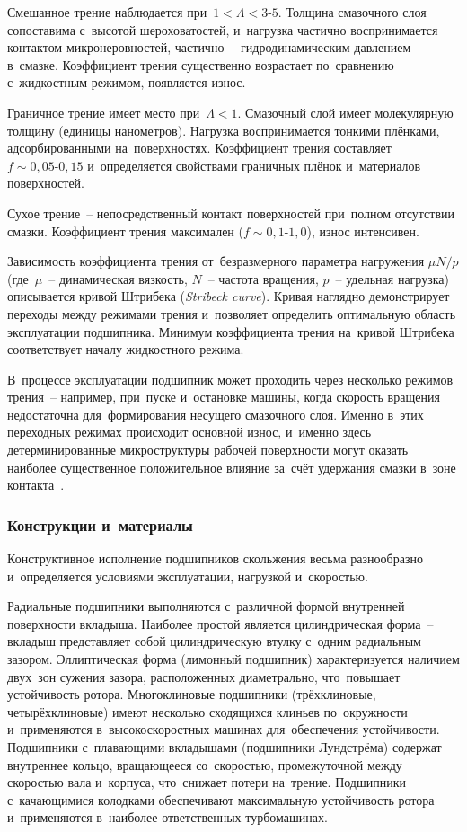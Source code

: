 Смешанное трение наблюдается при~$1 < \Lambda < 3\text{-}5$. Толщина смазочного слоя сопоставима с~высотой шероховатостей, и~нагрузка частично воспринимается контактом микронеровностей, частично~-- гидродинамическим давлением в~смазке. Коэффициент трения существенно возрастает по~сравнению с~жидкостным режимом, появляется износ.

Граничное трение имеет место при~$\Lambda < 1$. Смазочный слой имеет молекулярную толщину (единицы нанометров). Нагрузка воспринимается тонкими плёнками, адсорбированными на~поверхностях. Коэффициент трения составляет $f \sim 0{,}05\text{-}0{,}15$ и~определяется свойствами граничных плёнок и~материалов поверхностей.

Сухое трение~-- непосредственный контакт поверхностей при~полном отсутствии смазки. Коэффициент трения максимален ($f \sim 0{,}1\text{-}1{,}0$), износ интенсивен.

Зависимость коэффициента трения от~безразмерного параметра нагружения $\mu N / p$ (где~$\mu$~-- динамическая вязкость, $N$~-- частота вращения, $p$~-- удельная нагрузка) описывается кривой Штрибека (\textit{Stribeck curve}). Кривая наглядно демонстрирует переходы между режимами трения и~позволяет определить оптимальную область эксплуатации подшипника. Минимум коэффициента трения на~кривой Штрибека соответствует началу жидкостного режима.

В~процессе эксплуатации подшипник может проходить через несколько режимов трения~-- например, при~пуске и~остановке машины, когда скорость вращения недостаточна для~формирования несущего смазочного слоя. Именно в~этих переходных режимах происходит основной износ, и~именно здесь детерминированные микроструктуры рабочей поверхности могут оказать наиболее существенное положительное влияние за~счёт удержания смазки в~зоне контакта~\cite{senatore2018,bashmur2022}.

\subsubsection{Конструкции и~материалы}

Конструктивное исполнение подшипников скольжения весьма разнообразно и~определяется условиями эксплуатации, нагрузкой и~скоростью.

Радиальные подшипники выполняются с~различной формой внутренней поверхности вкладыша. Наиболее простой является цилиндрическая форма~-- вкладыш представляет собой цилиндрическую втулку с~одним радиальным зазором. Эллиптическая форма (лимонный подшипник) характеризуется наличием двух~зон сужения зазора, расположенных диаметрально, что~повышает устойчивость ротора. Многоклиновые подшипники (трёхклиновые, четырёхклиновые) имеют несколько сходящихся клиньев по~окружности и~применяются в~высокоскоростных машинах для~обеспечения устойчивости. Подшипники с~плавающими вкладышами (подшипники Лундстрёма) содержат внутреннее кольцо, вращающееся со~скоростью, промежуточной между скоростью вала и~корпуса, что~снижает потери на~трение. Подшипники с~качающимися колодками обеспечивают максимальную устойчивость ротора и~применяются в~наиболее ответственных турбомашинах.

